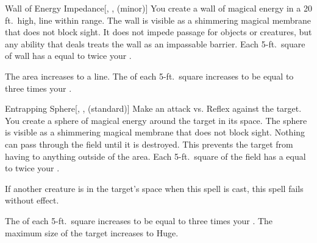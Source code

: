 \lowercase{\hypertarget{spell:Wall of Energy Impedance}{}}\label{spell:Wall of Energy Impedance}
\begin{freeability}[Rank 3]{\hypertarget{spell:Wall of Energy Impedance}{Wall of Energy Impedance}}[, ,  (minor)]
\targetrule
You create a wall of magical energy in a 20 ft.\ high, \areamed line within \rngmed range.
The wall is visible as a shimmering magical membrane that does not block sight.
It does not impede passage for objects or creatures, but any ability that deals  treats the wall as an impassable barrier.
Each 5-ft.\ square of wall has a  equal to twice your .

\rankline
{} The area increases to a \arealarge line.
 The  of each 5-ft.\ square increases to be equal to three times your .
\end{freeability}
\vspace{0.25em}



\lowercase{\hypertarget{spell:Entrapping Sphere}{}}\label{spell:Entrapping Sphere}
\begin{freeability}[Rank 4]{\hypertarget{spell:Entrapping Sphere}{Entrapping Sphere}}[, ,  (standard)]
Make an attack vs. Reflex against the target.
\hit You create a sphere of magical energy around the target in its space.
The sphere is visible as a shimmering magical membrane that does not block sight.
Nothing can pass through the field until it is destroyed.
This prevents the target from having  to anything outside of the area.
Each 5-ft.\ square of the field has a  equal to twice your .

If another creature is in the target's space when this spell is cast, this spell fails without effect.

\rankline
{} The  of each 5-ft.\ square increases to be equal to three times your .
 The maximum size of the target increases to Huge.
\end{freeability}
\vspace{0.25em}



